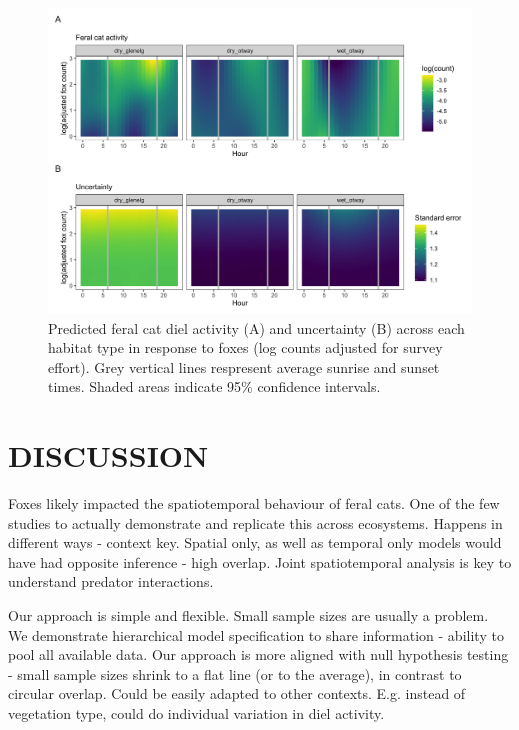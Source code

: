 \documentclass[]{elsarticle} %
\begin{document}
\newpage

\begin{figure}
\includegraphics[width=1\linewidth]{../figs/cat_fox_count} \caption{Predicted feral cat diel activity (A) and uncertainty (B) across each habitat type in response to foxes (log counts adjusted for survey effort). Grey vertical lines respresent average sunrise and sunset times. Shaded areas indicate 95\% confidence intervals.}\label{fig:count}
\end{figure}

\newpage

\hypertarget{discussion}{%
\section{DISCUSSION}\label{discussion}}

Foxes likely impacted the spatiotemporal behaviour of feral cats. One of the few studies to actually demonstrate and replicate this across ecosystems.
Happens in different ways - context key. Spatial only, as well as temporal only models would have had opposite inference - high overlap. Joint spatiotemporal analysis is key to understand predator interactions.

Our approach is simple and flexible.
Small sample sizes are usually a problem. We demonstrate hierarchical model specification to share information - ability to pool all available data.
Our approach is more aligned with null hypothesis testing - small sample sizes shrink to a flat line (or to the average), in contrast to circular overlap.
Could be easily adapted to other contexts. E.g. instead of vegetation type, could do individual variation in diel activity.
\end{document}
